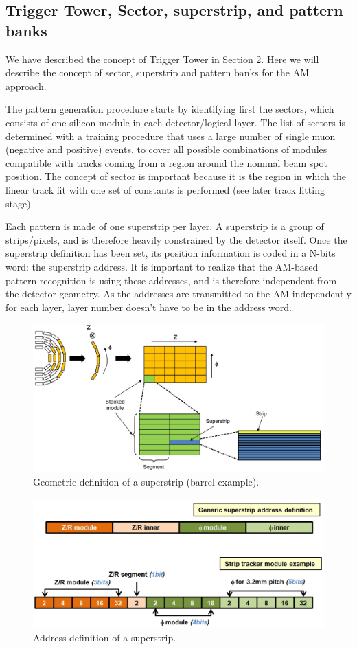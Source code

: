 \subsection{Trigger Tower, Sector, superstrip, and pattern banks}

\noindent We have described the concept of Trigger Tower in Section 2. Here we will describe the concept of sector, superstrip and pattern banks for the AM approach.

\noindent The pattern generation procedure starts by identifying first the sectors, which consists of one silicon module in each detector/logical layer. The list of sectors is determined with a training procedure that uses a large number of single muon (negative and positive) events, to cover all possible combinations of modules compatible with tracks coming from a region around the nominal beam spot position. The concept of sector is important because it is the region in which the linear track fit with one set of constants is performed (see later track fitting stage).

\noindent Each pattern is made of one superstrip per layer. A superstrip is a group of strips/pixels, and is therefore heavily constrained by the detector itself. Once the superstrip definition has been set, its position information is coded in a N-bits word: the superstrip address. It is important to realize that the AM-based pattern recognition is using these addresses, and is therefore independent from the detector geometry. As the addresses are transmitted to the AM independently for each layer, layer number doesn't have to be in the address word. 

\begin{figure}[ht!]
\centering
\includegraphics[width=0.8\columnwidth]{Plots/SStripDef.eps}
\caption{Geometric definition of a superstrip (barrel example).}
\label{fig:Det_to_SS}
\end{figure}
\begin{figure}[ht!]
\centering
\includegraphics[width=0.6\columnwidth]{Plots/SSaddress.eps}
\caption{Address definition of a superstrip.}
\label{fig:SS_def}
\end{figure}

